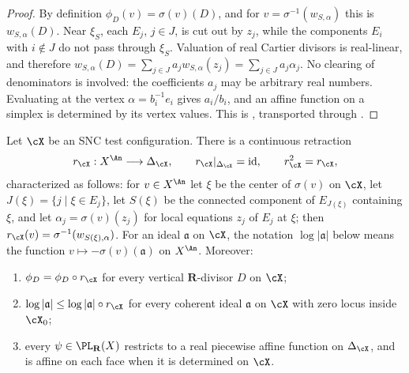 \begin{proof}
By definition $\phi_D(v)=\sigma(v)(D)$, and for
$v=\sigma^{-1}(w_{S,\alpha})$ this is $w_{S,\alpha}(D)$.  Near
$\xi_S$, each $E_j$, $j\in J$, is cut out by $z_j$, while the
components $E_i$ with $i\notin J$ do not pass through $\xi_S$.
Valuation of real Cartier divisors is real-linear, and therefore
$w_{S,\alpha}(D)=\sum_{j\in J}a_jw_{S,\alpha}(z_j)
=\sum_{j\in J}a_j\alpha_j$.  No clearing of denominators is involved:
the coefficients $a_j$ may be arbitrary real numbers.  Evaluating at the vertex
$\alpha=b_i^{-1}e_i$ gives $a_i/b_i$, and an affine function on a
simplex is determined by its vertex values.  This is
, transported through
.
\end{proof}

\begin{proposition}
\label{prop:ch34-retraction}
Let $\cX$ be an SNC test configuration.  There is a continuous
retraction
\begin{equation}
\label{eq:ch34-retraction}
 r_{\cX}:X^{\An}\longrightarrow\Delta_{\cX},
 \qquad
 r_{\cX}|_{\Delta_{\cX}}=\mathrm{id},\qquad r_{\cX}^2=r_{\cX},
\end{equation}
characterized as follows: for $v\in X^{\An}$ let $\xi$ be the center of
$\sigma(v)$ on $\cX$, let $J(\xi)=\{j\mid\xi\in E_j\}$, let
$S(\xi)$ be the connected component of $E_{J(\xi)}$ containing
$\xi$, and let $\alpha_j=\sigma(v)(z_j)$ for local equations $z_j$ of
$E_j$ at $\xi$; then
$r_{\cX}(v)=\sigma^{-1}(w_{S(\xi),\alpha})$.
For an ideal $\mathfrak a$ on $\cX$, the notation
$\log|\mathfrak a|$ below means the function
$v\mapsto-\sigma(v)(\mathfrak a)$ on $X^{\An}$.  Moreover:
\begin{enumerate}
\item\label{itm:ch34-retr:divisor}
  $\phi_D=\phi_D\circ r_{\cX}$ for every vertical $\mathbf R$-divisor
  $D$ on $\cX$;
\item\label{itm:ch34-retr:ideal}
  $\log|\mathfrak a|\le\log|\mathfrak a|\circ r_{\cX}$ for every coherent
  ideal $\mathfrak a$ on $\cX$ with zero locus inside $\cX_0$;
\item\label{itm:ch34-retr:pl}
  every $\psi\in\PL_{\mathbf R}(X)$ restricts to a real piecewise
  affine function on $\Delta_{\cX}$, and is affine on each face when it is
  determined on $\cX$.
\end{enumerate}
\par
\end{proposition}

